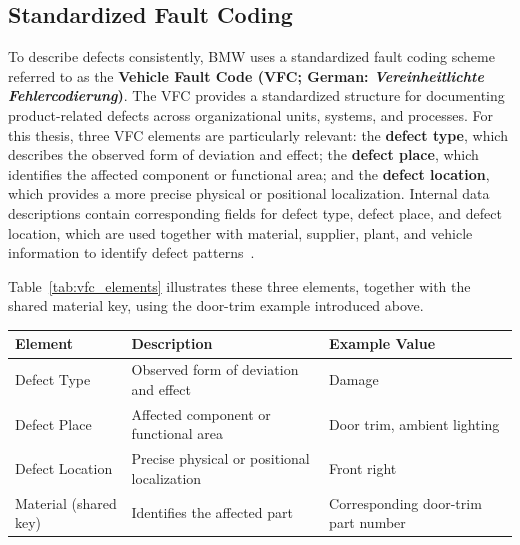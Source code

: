 \subsection{Standardized Fault Coding}\label{sec:fund_bmw_vfc}

To describe defects consistently, BMW uses a standardized fault coding
scheme referred to as the \textbf{Vehicle Fault Code (VFC; German:
\textit{Vereinheitlichte Fehlercodierung})}.
The VFC provides a standardized structure for documenting product-related
defects across organizational units, systems, and processes. For this
thesis, three VFC elements are particularly relevant: the \textbf{defect
type}, which describes the observed form of deviation and effect; the
\textbf{defect place}, which identifies the affected component or
functional area; and the \textbf{defect location}, which provides a more
precise physical or positional localization. Internal data descriptions
contain corresponding fields for defect type, defect place, and defect
location, which are used together with material, supplier, plant, and
vehicle information to identify defect patterns~\cite{bmwint_vfc}.

Table~\ref{tab:vfc_elements} illustrates these three elements, together
with the shared material key, using the door-trim example introduced
above.

\begin{minipage}{\textwidth}
\centering
\footnotesize
\renewcommand{\arraystretch}{0.9}
\captionsetup{type=table,skip=3pt}
\label{tab:vfc_elements}
\begin{tabular}{lp{5cm}p{3.6cm}}
  \toprule
  \textbf{Element} & \textbf{Description} & \textbf{Example Value} \\
  \midrule
  Defect Type &
    Observed form of deviation and effect &
    Damage \\
  Defect Place &
    Affected component or functional area &
    Door trim, ambient lighting \\
  Defect Location &
    Precise physical or positional localization &
    Front right \\
  Material (shared key) &
    Identifies the affected part &
    Corresponding door-trim part number \\
  \bottomrule
\end{tabular}
\end{minipage}
\vspace{\baselineskip}

